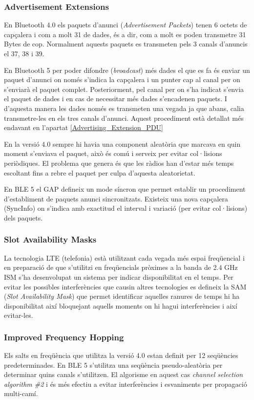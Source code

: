 \subsubsection{Advertisement Extensions}
\label{Advertisement_Extensions}
En Bluetooth 4.0 els paquets d'anunci (\textit{Advertisement Packets}) tenen 6 octets de capçalera i com a molt 31 de dades, és a dir, com a molt es poden transmetre 31 Bytes de cop.
Normalment aquests paquets es transmeten pels 3 canals d'anuncis el 37, 38 i 39.

En Bluetooth 5 per poder difondre (\textit{broadcast}) més dades el que es fa és enviar un paquet d'anunci on només s'indica la capçalera i un punter cap al canal per on s'enviarà el paquet complet.
Posteriorment, pel canal per on s'ha indicat s'envia el paquet de dades i en cas de necessitar més dades s'encadenen paquets.
I d'aquesta manera les dades només es transmeten una vegada ja que abans, calia transmetre-les en els tres canals d'anunci.
Aquest procediment està detallat més endavant en l'apartat  \ref{Advertising_Extension_PDU}

En la versió 4.0 sempre hi havia una component aleatòria que marcava en quin moment s'enviava el paquet, això és comú i serveix per evitar col·lisions periòdiques.
El problema que genera és que les ràdios han d'estar més temps escoltant fins a rebre el paquet per culpa d'aquesta aleatorietat.

En BLE 5 el GAP defineix un mode síncron que permet establir un procediment d'establiment de paquets anunci sincronitzats.
Existeix una nova capçalera (SyncInfo) on s'indica amb exactitud el interval i variació (per evitar col·lisions) dels paquets.    

\subsubsection{Slot Availability Masks}
La tecnologia LTE (telefonia) està utilitzant cada vegada més espai freqüencial i en preparació de que s'utilitzi en freqüencials pròximes a la banda de 2.4 GHz ISM s'ha desenvolupat un sistema per indicar disponibilitat en el temps.
Per evitar les possibles interferències que causin altres tecnologies es defineix la SAM (\textit{Slot Availability Mask}) que permet identificar aquelles ranures de temps hi ha disponibilitat així bloquejant aquells moments on hi hagui interferències i així evitar-les.

\subsubsection{Improved Frequency Hopping}
Els salts en freqüència que utilitza la versió 4.0 estan definit per 12 seqüències predeterminades.
En BLE 5 s'utilitza una seqüència pseudo-aleatòria per determinar quins canals s'utilitzen. El algorisme en aquest cas \textit{channel selection algorithm \#2} i és més efectiu a evitar interferències i esvaniments per propagació multi-camí.

